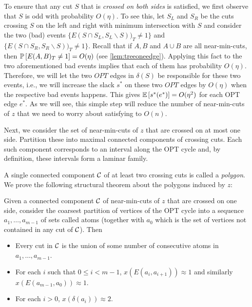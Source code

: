 To ensure that any cut $S$ that is {\em crossed on both sides} is satisfied, we first observe that $S$ is odd with probability  $O(\eta)$.  To see this, let $S_L$ and $S_R$ be the cuts crossing $S$ on the left and right with minimum intersection with $S$ and consider
the two (bad) events $\{E(S\cap S_L, S_L \smallsetminus S))_T\ne 1\}$
and $\{E(S\cap S_R, S_R \smallsetminus S))_T\ne 1\}$. Recall that if $A,B$ and $A\cup B$ are all near-min-cuts, then $\P{ E(A,B)_T \ne  1}=  O(\eta)$ (see \cref{lem:treeoneedge}).
Applying this fact to the two aforementioned bad events implies that each of them has probability $O(\eta)$. Therefore, we will let the two $OPT$ edges in $\delta(S)$ be responsible for these two events, i.e.,   we will increase the slack $s^*$ on these two $OPT$ edges by $O(\eta)$ when the respective bad events happens. This gives  $\E{s^*(e^*)} = O(\eta^2)$ for each OPT edge $e^*$. As we will see, this  simple step will reduce the number of near-min-cuts of $z$ that we need to worry about satisfying to $O(n)$.


Next, we consider the set of near-min-cuts of $z$ that are crossed on at most one side. Partition these into maximal connected components of crossing cuts. Each such component corresponds to an interval along the OPT cycle and, by definition, these intervals form a laminar family. 

A single connected component $\cC$ of at least two crossing cuts  is called a {\em polygon}. 
We prove the following structural theorem about the polygons induced by $z$:

\begin{theorem}\label{thm:approxpoly}
Given a connected component $\cC$ of near-min-cuts of $z$ that are crossed on one side, consider the coarsest partition of vertices of the OPT cycle into 
a sequence  $a_1, \ldots, a_{m-1}$ of sets called atoms (together with $a_0$ which is the set of vertices not contained in any cut of $\cC$). Then 
\begin{itemize}
\item Every cut in $\cC$ is the union of some number of consecutive atoms in $a_1, \ldots, a_{m-1}$.
\item 	For each $i$ such that  $0\le i < m-1$, $x(E(a_i, a_{i+1})) \approx 1$ and similarly $x(E(a_{m-1}, a_{0})) \approx 1$.
\item For each $i>0$, $x(\delta(a_i))\approx 2$.
\end{itemize}
 
\end{theorem}


